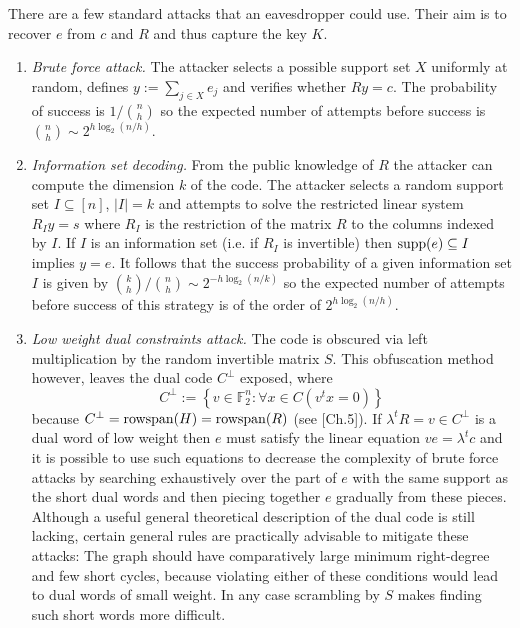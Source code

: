 \documentclass[12pt]{amsart}
\theoremstyle{definition}
\newcommand{\FF}{\ensuremath{\mathbb{F}}}
\newcommand{\1}{\ensuremath{\mathbb{1}}}
\begin{document}
There are a few standard attacks that an eavesdropper could use. Their aim is to recover $e$ from $c$ and $R$ and thus capture the key $K$. \begin{enumerate}
\item \emph{Brute force attack.}  The attacker selects a possible support set $X$ uniformly at random, defines $y:=\sum_{j\in X} e_j$ and verifies whether $Ry=c$. The probability of success is $1/\binom{n}{h}$ so the expected number of attempts before success is $\binom{n}{h}\sim 2^{h\log_2\left(n/h\right)}$.

\item \emph{Information set decoding.} From the public knowledge of $R$ the attacker can compute the dimension $k$ of the code. The attacker selects a random support set $I\subseteq [n]$, $|I|=k$ and attempts to solve the restricted linear system $R_Iy=s$ where $R_I$ is the restriction of the matrix $R$ to the columns indexed by $I$. If $I$ is an information set (i.e. if $R_I$ is invertible) then ${\rm supp}(e)\subseteq I$ implies $y=e$. It follows that the success probability of a given information set $I$ is given by $\binom{k}{h}/\binom{n}{h}\sim 2^{-h\log_2(n/k)}$ so the expected number of attempts before success of this strategy is of the order of $2^{h\log_2(n/h)}$.

\item \emph{Low weight dual constraints attack.} The code is obscured via left multiplication by the random invertible matrix $S$. This obfuscation method however, leaves the dual code $C^{\perp}$ exposed, where 
\[C^{\perp}:=\left\{v\in \FF_2^n: \forall x\in C\left(v^tx=0\right) \right\}\]
because $C^{\perp}={\rm rowspan}(H)={\rm rowspan}(R)$ (see \cite{MWS}[Ch.5]). If $\lambda^tR=v\in C^{\perp}$ is a dual word of low weight then $e$ must satisfy the linear equation $ve=\lambda^tc$ and it is possible to use such equations to decrease the complexity of brute force attacks by searching exhaustively over the part of $e$ with the same support as the short dual words and then piecing together $e$ gradually from these pieces. Although a useful general theoretical description of the dual code is still lacking, certain general rules are practically advisable to mitigate these attacks: The graph should have comparatively large minimum right-degree and few short cycles, because violating either of these conditions would lead to dual words of small weight. In any case scrambling by $S$ makes finding such short words more difficult.
\end{enumerate}
\end{document}
